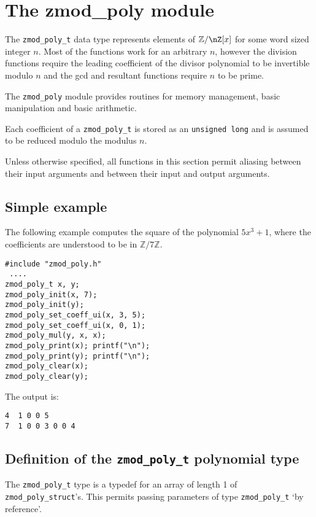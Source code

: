 \documentclass[a4paper,10pt]{article}
\newcommand{\Z}{\mathbb{Z}}
\newcommand{\code}{\lstinline}
\begin{document}
\section{The zmod\_poly module}

The \code{zmod_poly_t} data type represents elements of $\Z/\nZ[x]$ for some word sized integer $n$. Most of the functions work for an arbitrary $n$, however the division functions require the leading coefficient of the divisor polynomial to be invertible modulo $n$ and the gcd and resultant functions require $n$ to be prime.

The \code{zmod_poly} module provides routines for memory management, basic manipulation and basic arithmetic.

Each coefficient of a \code{zmod_poly_t} is stored as an \code{unsigned long} and is assumed to be reduced modulo the modulus $n$.

Unless otherwise specified, all functions in this section permit aliasing between their input arguments and between their input and output arguments. 

\subsection{Simple example}

The following example computes the square of the polynomial $5x^3 + 1$, where the coefficients are understood to be in $\Z/7\Z$.

\begin{lstlisting}
#include "zmod_poly.h"
 ....
zmod_poly_t x, y;
zmod_poly_init(x, 7);
zmod_poly_init(y);
zmod_poly_set_coeff_ui(x, 3, 5);
zmod_poly_set_coeff_ui(x, 0, 1);
zmod_poly_mul(y, x, x);
zmod_poly_print(x); printf("\n");
zmod_poly_print(y); printf("\n");
zmod_poly_clear(x);
zmod_poly_clear(y);
\end{lstlisting}

The output is:

\begin{lstlisting}
4  1 0 0 5
7  1 0 0 3 0 0 4
\end{lstlisting}

\subsection{Definition of the \code{zmod_poly_t} polynomial type}

The \code{zmod_poly_t} type is a typedef for an array of length 1 of \code{zmod_poly_struct}'s. This permits passing parameters  of type \code{zmod_poly_t} `by reference'. 
\end{document}
